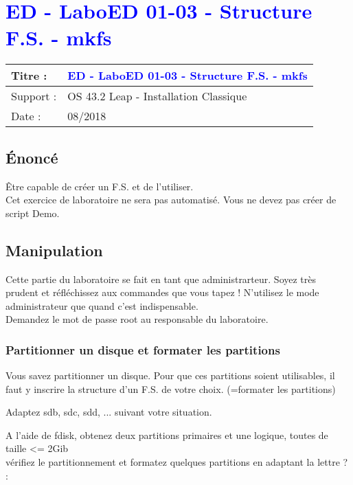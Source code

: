 \lstset{language=c}
\renewcommand{\titre}{\textcolor{blue}{ ED - LaboED 01-03 - Structure F.S. - mkfs}}

\lhead{ \titre }
\section{{\titre} }

\begin{tabular}{|l|l|}
\hline
Titre : 	& \titre \\\hline
Support : 	& OS 43.2 Leap - Installation Classique \\\hline
Date :		& 08/2018 \\\hline
\end{tabular}

\subsection{Énoncé}

Être capable de créer un F.S. et de l'utiliser.\\
Cet exercice de laboratoire ne sera pas automatisé. Vous ne devez pas créer de script Demo.

\subsection{Manipulation}

Cette partie du laboratoire se fait en tant que administrarteur. Soyez très prudent et réfléchissez aux commandes que vous tapez !
N'utilisez le mode administrateur que quand c'est indispensable.\\
Demandez le mot de passe root au responsable du laboratoire.

\subsubsection{Partitionner un disque et formater les partitions}

Vous savez partitionner un disque. Pour que ces partitions soient utilisables, il faut y inscrire la structure d'un F.S. de votre choix. (=formater les partitions)

Adaptez sdb, sdc, sdd, ... suivant votre situation.

A l'aide de fdisk, obtenez deux partitions primaires et une logique, toutes de taille <= 2Gib\\
vérifiez le partitionnement et formatez quelques partitions en adaptant la lettre ? :


